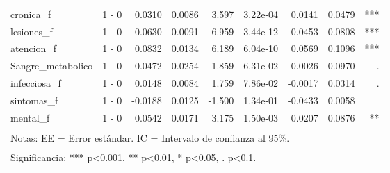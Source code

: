 \begin{table}[!h]
{\begin{tabular}[t]{llrrrrrrr}
\addlinespace
cronica\_f & 1 - 0 & 0.0310 & 0.0086 & 3.597 & 3.22e-04 & 0.0141 & 0.0479 & ***\\
lesiones\_f & 1 - 0 & 0.0630 & 0.0091 & 6.959 & 3.44e-12 & 0.0453 & 0.0808 & ***\\
atencion\_f & 1 - 0 & 0.0832 & 0.0134 & 6.189 & 6.04e-10 & 0.0569 & 0.1096 & ***\\
Sangre\_metabolico & 1 - 0 & 0.0472 & 0.0254 & 1.859 & 6.31e-02 & -0.0026 & 0.0970 & .\\
infecciosa\_f & 1 - 0 & 0.0148 & 0.0084 & 1.759 & 7.86e-02 & -0.0017 & 0.0314 & .\\
sintomas\_f & 1 - 0 & -0.0188 & 0.0125 & -1.500 & 1.34e-01 & -0.0433 & 0.0058 & \\
mental\_f & 1 - 0 & 0.0542 & 0.0171 & 3.175 & 1.50e-03 & 0.0207 & 0.0876 & **\\



\bottomrule
\multicolumn{9}{l}{\textsuperscript{} Notas: EE = Error estándar. IC = Intervalo de confianza al 95\%.}\\
\multicolumn{9}{l}{\textsuperscript{} Significancia: *** p<0.001, ** p<0.01, * p<0.05, . p<0.1.}\\
\end{tabular}}
\end{table}

